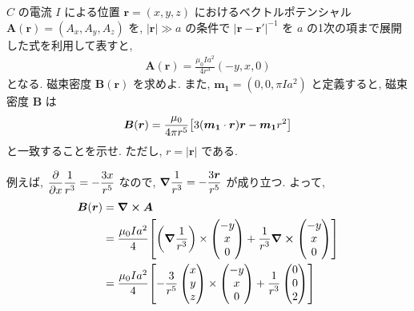 \documentclass[../../ou-physics-exam.tex]{subfiles}
\begin{document}
$ C $ の電流 $ I $ による位置 $ \bm{r} = (x, y, z) $ におけるベクトルポテンシャル $ \bm{A} (\bm{r}) = (A_x, A_y, A_z) $ を, $ | \bm{r} | \gg a $ の条件で $ | \bm{r} - \bm{r'} |^{-1} $ を $ a $ の1次の項まで展開した式を利用して表すと,
\begin{align*}
    \bm{A} (\bm{r}) = \frac{\mu_0 I a^2}{4r^3} (-y, x, 0)
\end{align*}
となる. 
磁束密度 $ \bm{B} (\bm{r}) $ を求めよ. 
また, $ \bm{m_1} = (0, 0, \pi Ia^2) $ と定義すると, 磁束密度 $ \bm{B} $ は
\begin{align*}
    \bm{B} (\bm{r}) = \frac{\mu_0}{4 \pi r^5} \qty[3 ( \bm{m_1} \cdot \bm{r}) \bm{r} - \bm{m_1} r^2 ]
\end{align*}
と一致することを示せ. 
ただし, $ r = | \bm{r} | $ である.
\begin{answer}
    例えば, $ \displaystyle \pdv{x} \frac{1}{r^3} = - \frac{3x}{r^5} $ なので, $ \displaystyle \grad \frac{1}{r^3} = - \frac{3 \bm{r}}{r^5} $ が成り立つ. 
    よって,
    \begin{align*}
        \bm{B} (\bm{r}) 
        & = \curl \bm{A} \\
        & = \frac{\mu_0 Ia^2}{4} \qty[ \qty(\grad \frac{1}{r^3}) \times 
        \begin{pmatrix}
            -y \\ x \\ 0
        \end{pmatrix}
        + \frac{1}{r^3} \curl
        \begin{pmatrix}
            -y \\ x \\ 0
        \end{pmatrix} ] \\
        & = \frac{\mu_0 Ia^2}{4} \qty[- \frac{3}{r^5} 
        \begin{pmatrix}
            x \\ y \\ z
        \end{pmatrix}
        \times 
        \begin{pmatrix}
            -y \\ x \\ 0
        \end{pmatrix}
        + \frac{1}{r^3} 
        \begin{pmatrix}
            0 \\ 0 \\ 2
        \end{pmatrix} ] \\

\end{align*}
\end{answer}
\end{document}
